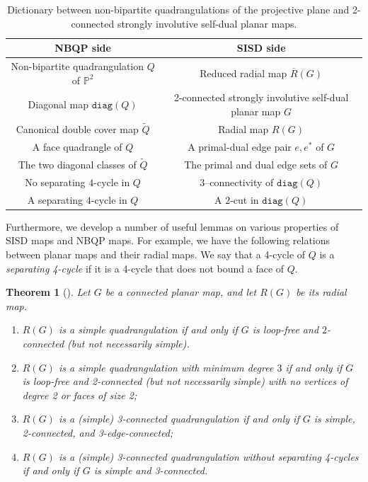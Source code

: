 \documentclass{article}
\renewcommand{\arraystretch}{1.5}
\newtheorem{theorem}{Theorem}[section]
\newcommand{\Pb}[0]{\mathbb{P}}
\newcommand{\diag}[0]{\mathtt{diag}}
\begin{document}
 \begin{table}[ht]
\centering
\renewcommand{\arraystretch}{1.25}
\begin{tabular}{c|c}
\textbf{NBQP side} & \textbf{SISD side} \\
\hline
Non-bipartite quadrangulation $Q$ of $\Pb^2$
&
Reduced radial map $\overline R(G)$
\\
Diagonal map  $\diag(Q)$
&
2-connected strongly involutive self-dual planar map $G$
\\

Canonical double cover map $\widetilde Q$
&
Radial map $R(G)$
\\

A face quadrangle of $Q$
&
A primal-dual edge pair $e,e^*$ of $G$
\\

The two diagonal classes of $\widetilde Q$
&
The primal and dual edge sets of $G$
\\

No separating $4$-cycle in $Q$
&
3--connectivity of $\diag(Q)$
\\

A separating $4$-cycle in $Q$
&
A $2$-cut in $\diag(Q)$
\\

\end{tabular}
\caption{Dictionary between non-bipartite quadrangulations of the projective plane and 2-connected strongly involutive self-dual planar maps.}
\label{tab:nbqp-sisd-dictionary}
\end{table}
 

Furthermore, we develop a number of useful lemmas on various properties of SISD maps and NBQP maps. For example, we have the following relations between planar maps and their radial maps. We say that a 4-cycle of $Q$ is a \emph{separating 4-cycle} if it is a 4-cycle that does not bound a face of $Q$.  

\begin{theorem}[{\cite[Theorem~5]{BrinkmannEtAl2005}}]\label{thm:radialprops}   
Let $G$ be a connected planar map, and let $R(G)$ be its radial map. 
\begin{enumerate}
    
    \item $R(G)$ is a simple quadrangulation if and only if $G$ is loop-free and $2$-connected (but not necessarily simple).
    \item $R(G)$ is a simple quadrangulation with minimum degree $3$ if and only if $G$ is loop-free and 2-connected (but not necessarily simple) with no vertices of degree 2 or faces of size 2;
    \item $R(G)$ is a (simple) 3-connected quadrangulation if and only if $G$ is simple, 2-connected, and 3-edge-connected;
    \item $R(G)$ is a (simple) 3-connected quadrangulation without separating 4-cycles if and only if $G$ is simple and 3-connected.
\end{enumerate}
\end{theorem}
\end{document}
